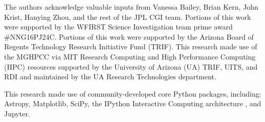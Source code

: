 \documentclass[]{spie}  %
\begin{document}
\acknowledgments %


The authors acknowledge valuable inputs from  Vanessa Bailey,  Brian Kern, John Krist, Hanying Zhou,   and the rest of the JPL CGI team.
Portions of this work were supported by the WFIRST Science Investigation team prime award \#NNG16PJ24C.
Portions of this work were supported by the Arizona Board of Regents Technology Research
Initiative Fund (TRIF).
This research made use of the \gls{MGHPCC} via MIT Research Computing and High Performance Computing (HPC) resources supported by the University of Arizona (UA) TRIF, UITS, and RDI and maintained by the UA Research Technologies department.


This research made use of community-developed core Python packages, including: Astropy\cite{the_astropy_collaboration_astropy_2013}, Matplotlib\cite{hunter_matplotlib_2007}, SciPy\cite{jones_scipy_2001}, 
the IPython Interactive Computing architecture \cite{perez_ipython_2007}, and Jupyter\cite{kluyver_jupyter_2016}.
\end{document}
